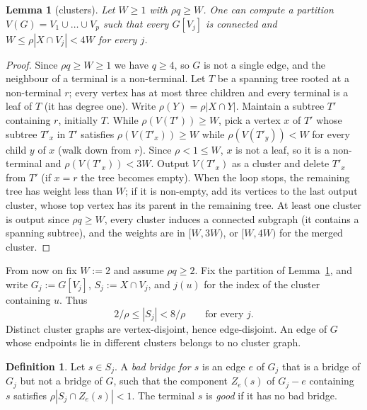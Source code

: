 \documentclass[11pt,letterpaper]{article}
\newtheorem{lemma}[theorem]{Lemma}
\theoremstyle{definition}
\newtheorem{definition}[theorem]{Definition}
\begin{document}
\begin{lemma}[clusters]\label{lem:clusters}
Let $W\ge1$ with $\rho q\ge W$. One can compute a partition $V(G)=V_1\cup\dots\cup V_p$ such
that every $G[V_j]$ is connected and $W\le\rho|X\cap V_j|<4W$ for every $j$.
\end{lemma}
\begin{proof}
Since $\rho q\ge W\ge1$ we have $q\ge 4$, so $G$ is not a single edge, and the neighbour of a
terminal is a non-terminal. Let $T$ be a spanning tree rooted at a non-terminal $r$; every
vertex has at most three children and every terminal is a leaf of $T$ (it has degree one).
Write $\rho(Y)=\rho|X\cap Y|$. Maintain a subtree $T'$ containing $r$, initially $T$. While
$\rho(V(T'))\ge W$, pick a vertex $x$ of $T'$ whose subtree $T'_x$ in $T'$ satisfies
$\rho(V(T'_x))\ge W$ while $\rho(V(T'_y))<W$ for every child $y$ of $x$ (walk down from $r$).
Since $\rho<1\le W$, $x$ is not a leaf, so it is a non-terminal and
$\rho(V(T'_x))<3W$. Output $V(T'_x)$ as a cluster and delete $T'_x$ from $T'$ (if $x=r$ the
tree becomes empty). When the loop stops, the remaining tree has weight less than $W$; if it
is non-empty, add its vertices to the last output cluster, whose top vertex has its parent in
the remaining tree. At least one cluster is output since $\rho q\ge W$, every cluster induces
a connected subgraph (it contains a spanning subtree), and the weights are in $[W,3W)$, or
$[W,4W)$ for the merged cluster.
\end{proof}

From now on fix $W:=2$ and assume $\rho q\ge2$. Fix the partition of
Lemma~\ref{lem:clusters}, and write $G_j:=G[V_j]$, $S_j:=X\cap V_j$, and $j(u)$ for the index
of the cluster containing $u$. Thus
\begin{equation}\label{eq:clustersize}
2/\rho\le|S_j|<8/\rho\qquad\text{for every }j.
\end{equation}
Distinct cluster graphs are vertex-disjoint, hence edge-disjoint. An edge of $G$ whose
endpoints lie in different clusters belongs to no cluster graph.

\begin{definition}
Let $s\in S_j$. A \emph{bad bridge for $s$} is an edge $e$ of $G_j$ that is a bridge of
$G_j$ but not a bridge of $G$, such that the component $Z_e(s)$ of $G_j-e$ containing $s$
satisfies $\rho|S_j\cap Z_e(s)|<1$. The terminal $s$ is \emph{good} if it has no bad bridge.
\end{definition}
\end{document}
